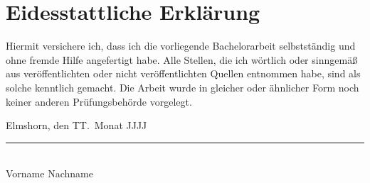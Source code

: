 \section*{Eidesstattliche Erkl\"{a}rung}
Hiermit versichere ich, dass ich die vorliegende Bachelorarbeit selbstst\"{a}ndig und ohne
fremde Hilfe angefertigt habe.
Alle Stellen, die ich w\"{o}rtlich oder sinngem\"{a}{\ss} aus ver\"{o}ffentlichten oder nicht
ver\"{o}ffentlichten Quellen entnommen habe, sind als solche kenntlich gemacht.
Die Arbeit wurde in gleicher oder \"{a}hnlicher Form noch keiner anderen Pr\"{u}fungsbeh\"{o}rde
vorgelegt.

\vspace{2cm}

\noindent Elmshorn, den TT.\ Monat JJJJ

\vspace{1.5cm}

\noindent\rule{7cm}{0.4pt}\\
Vorname Nachname

\newpage
\clearpage
